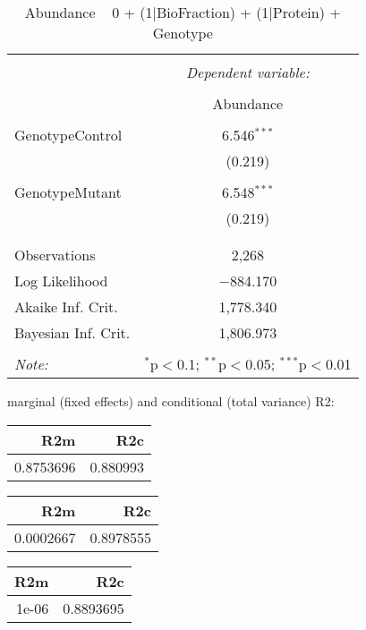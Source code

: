 \documentclass[11pt]{report}
\begin{document}
\begin{table}[!htbp] \centering 
  \caption{Abundance ~ 0 + (1|BioFraction) + (1|Protein) + Genotype} 
  \label{} 
\begin{tabular}{@{\extracolsep{5pt}}lc} 
\\[-1.8ex]\hline 
\hline \\[-1.8ex] 
 & \multicolumn{1}{c}{\textit{Dependent variable:}} \\ 
\cline{2-2} 
\\[-1.8ex] & Abundance \\ 
\hline \\[-1.8ex] 
 GenotypeControl & 6.546$^{***}$ \\ 
  & (0.219) \\ 
  & \\ 
 GenotypeMutant & 6.548$^{***}$ \\ 
  & (0.219) \\ 
  & \\ 
\hline \\[-1.8ex] 
Observations & 2,268 \\ 
Log Likelihood & $-$884.170 \\ 
Akaike Inf. Crit. & 1,778.340 \\ 
Bayesian Inf. Crit. & 1,806.973 \\ 
\hline 
\hline \\[-1.8ex] 
\textit{Note:}  & \multicolumn{1}{r}{$^{*}$p$<$0.1; $^{**}$p$<$0.05; $^{***}$p$<$0.01} \\ 
\end{tabular} 
\end{table} 
marginal (fixed effects) and conditional (total variance) R2:

\begin{tabular}{r|r}
\hline
R2m & R2c\\
\hline
0.8753696 & 0.880993\\
\hline
\end{tabular}

\begin{tabular}{r|r}
\hline
R2m & R2c\\
\hline
0.0002667 & 0.8978555\\
\hline
\end{tabular}

\begin{tabular}{r|r}
\hline
R2m & R2c\\
\hline
1e-06 & 0.8893695\\
\hline
\end{tabular}
\end{document}
